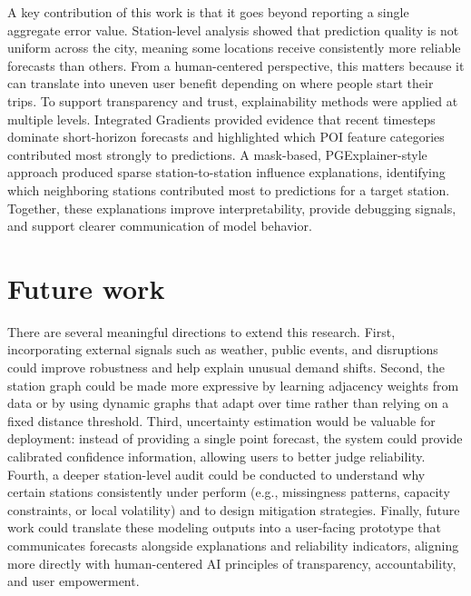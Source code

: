 \documentclass[11pt]{report}
\begin{document}
A key contribution of this work is that it goes beyond reporting a single aggregate error value. Station-level analysis showed that prediction quality is not uniform across the city, meaning some locations receive consistently more reliable forecasts than others. From a human-centered perspective, this matters because it can translate into uneven user benefit depending on where people start their trips. To support transparency and trust, explainability methods were applied at multiple levels. Integrated Gradients provided evidence that recent timesteps dominate short-horizon forecasts and highlighted which POI feature categories contributed most strongly to predictions. A mask-based, PGExplainer-style approach produced sparse station-to-station influence explanations, identifying which neighboring stations contributed most to predictions for a target station. Together, these explanations improve interpretability, provide debugging signals, and support clearer communication of model behavior.

\section*{Future work}
There are several meaningful directions to extend this research. First, incorporating external signals such as weather, public events, and disruptions could improve robustness and help explain unusual demand shifts. Second, the station graph could be made more expressive by learning adjacency weights from data or by using dynamic graphs that adapt over time rather than relying on a fixed distance threshold. Third, uncertainty estimation would be valuable for deployment: instead of providing a single point forecast, the system could provide calibrated confidence information, allowing users to better judge reliability. Fourth, a deeper station-level audit could be conducted to understand why certain stations consistently under perform (e.g., missingness patterns, capacity constraints, or local volatility) and to design mitigation strategies. Finally, future work could translate these modeling outputs into a user-facing prototype that communicates forecasts alongside explanations and reliability indicators, aligning more directly with human-centered AI principles of transparency, accountability, and user empowerment.



\nocite{*}


\end{document}
